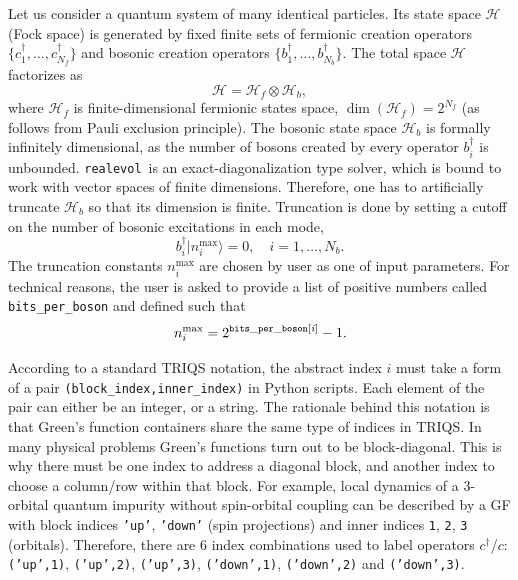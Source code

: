 \documentclass[]{article}
\newcommand{\realevol}{\texttt{realevol}}
\newcommand{\ket}[1]{\ensuremath{|#1\rangle}}
\begin{document}
Let us consider a quantum system of many identical particles. Its state space $\mathcal{H}$ (Fock space) is generated by fixed finite sets of fermionic creation operators $\{c^\dagger_1,\ldots,c^\dagger_{N_f}\}$ and bosonic creation operators $\{b^\dagger_1,\ldots,b^\dagger_{N_b}\}$. The total space $\mathcal{H}$ factorizes as
\begin{equation}
    \mathcal{H} = \mathcal{H}_f \otimes \mathcal{H}_b,
\end{equation}
where $\mathcal{H}_f$ is finite-dimensional fermionic states space, $\dim(\mathcal{H}_f) = 2^{N_f}$ (as follows from Pauli exclusion principle). The bosonic state space $\mathcal{H}_b$ is formally infinitely dimensional, as the number of bosons created by every operator $b^\dagger_i$ is unbounded.
\realevol\ is an exact-diagonalization type solver, which is bound to work with vector spaces of finite dimensions. Therefore, one has to artificially truncate $\mathcal{H}_b$ so that its dimension is finite. Truncation is done by setting a cutoff on the number of bosonic excitations in each mode,
\begin{equation}
    b^\dagger_i\ket{n_i^\mathrm{max}} = 0, \quad i=1,\ldots,N_b.
\end{equation}
The truncation constants $n_i^\mathrm{max}$ are chosen by user as one of input parameters. For technical reasons, the user is asked to provide a list of positive numbers called \texttt{bits\_per\_boson} and defined such that
\begin{equation}
    n_i^\mathrm{max} = 2^\mathtt{bits\_per\_boson[{\it i}]} - 1.
\end{equation}

According to a standard TRIQS notation, the abstract index $i$ must take a form
of a pair \texttt{(block\_index,inner\_index)} in Python scripts. Each element
of the pair can either be an integer, or a string. The rationale behind this
notation is that Green's function containers share the same type of indices in TRIQS. In many physical problems Green's functions turn out to be block-diagonal. This is why there must be one index to address a diagonal block,
and another index to choose a column/row within that block. For example, local
dynamics of a 3-orbital quantum impurity without spin-orbital coupling can be
described by a GF with block indices \texttt{'up'}, \texttt{'down'} (spin
projections) and inner indices \texttt{1}, \texttt{2}, \texttt{3} (orbitals). Therefore, there are 6
index combinations used to label operators $c^\dagger$/$c$:
\texttt{('up',1)}, \texttt{('up',2)}, \texttt{('up',3)}, \texttt{('down',1)},
\texttt{('down',2)} and \texttt{('down',3)}.
\end{document}
